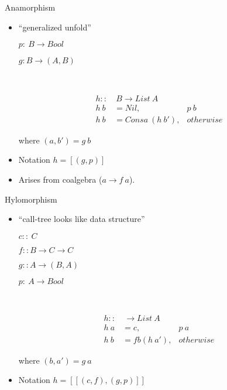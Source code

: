 \documentclass{beamer}
\begin{document}
\begin{frame}{Anamorphism}
\begin{itemize}
\item ``generalized unfold''

$p:\ B\rightarrow Bool$

$g: B \rightarrow (A,B)$ 


~

\begin{align*}
h::&\  B \rightarrow List\ A\\ 
h\ b &= Nil, & p \ b \\
h\ b &=  Cons a\ (h\ b'),& otherwise
\end{align*}

where $(a,b') = g\ b $



\item Notation $h = [\!(g,p)\!]$
\item Arises from coalgebra ($a \rightarrow f\ a$).
\end{itemize}

\end{frame}

\begin{frame}{Hylomorphism}
\begin{itemize}
\item ``call-tree looks like data structure''

$c::\ C$

$f:: B\rightarrow C \rightarrow C$ 

$g:: A \rightarrow (B,A)$


$p:\ A\rightarrow Bool$

~

\begin{align*}
h::&\   \rightarrow List\ A\\ 
h\ a &= c, & p \ a \\
h\ b &= f b (h\ a'), & otherwise
\end{align*}

where $(b, a') = g\ a$



\item Notation $h = [\![(c,f), (g,p)]\!]$
\end{itemize}

\end{frame}
\end{document}
